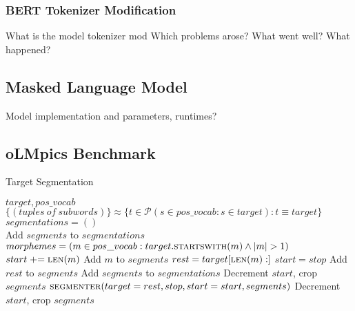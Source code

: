 \subsubsection{BERT Tokenizer Modification}
\label{subsubsec:tokenizer-modification}
What is the model tokenizer mod
Which problems arose? What went well? What happened?



\subsection{Masked Language Model}
\label{subsec:masked-language-model}
Model implementation and parameters, runtimes?

\subsection{oLMpics Benchmark}
\label{subsec:olmpics-benchmark}

\begin{algorithm}
    \caption{Target Segmentation}\label{alg:segmenter}
    \begin{algorithmic}[1]
        \Require $target,pos\_vocab$ 
        \Ensure $\{(tuples\:of\:subwords)\} \approx \{ t \in \mathcal{P} (s \in pos\_vocab : s \in target) : t \equiv target\}$
        \\
        \State $segmentations = ()$
        \\

            \State Add $segments$ to $segmentations$
        \Else
            \State $morphemes = (m \in pos\_vocab : target. \textsc{startswith}(m) \wedge |m|>1)$
                \State $start \mathrel{+}= \textsc{len}(m)$
                \State Add $m$ to $segments$
                \State $rest = target[\textsc{len}(m):]$
                    \State $start = stop$
                    \State Add $rest$ to $segments$
                    \State Add $segments$ to $segmentations$
                    \State Decrement $start$, crop $segments$
                \Else
                    \State $\textsc{segmenter}(target=rest, stop, start=start, segments)$
                    \State Decrement $start$, crop $segments$
                \EndIf
            \EndFor
        \EndIf
        \EndFunction
    \end{algorithmic}
\end{algorithm}

